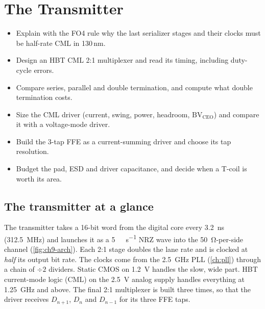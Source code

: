 \chapter{The Transmitter}\label{ch:tx}

\begin{objectives}
\begin{itemize}
  \item Explain with the FO4 rule why the last serializer stages and their clocks must be half-rate CML in 130\,nm.
  \item Design an HBT CML 2:1 multiplexer and read its timing, including duty-cycle errors.
  \item Compare series, parallel and double termination, and compute what double termination costs.
  \item Size the \OS{} CML driver (current, swing, power, headroom, $\mathrm{BV}_\mathrm{CEO}$) and compare it with a voltage-mode driver.
  \item Build the 3-tap FFE as a current-summing driver and choose its tap resolution.
  \item Budget the pad, ESD and driver capacitance, and decide when a T-coil is worth its area.
\end{itemize}
\end{objectives}

\section{The transmitter at a glance}\label{sec:ch9-overview}

The transmitter takes a 16-bit word from the digital core every \qty{3.2}{\nano\second} (\qty{312.5}{\mega\hertz}) and launches it as a \qty{5}{\giga\bit\per\second} NRZ wave into the \qty{50}{\ohm}-per-side channel (\cref{fig:ch9-arch}). Each 2:1 stage doubles the lane rate and is clocked at \emph{half} its output bit rate. The clocks come from the \qty{2.5}{\giga\hertz} PLL (\cref{ch:pll}) through a chain of $\div2$ dividers. Static CMOS on \qty{1.2}{\volt} handles the slow, wide part. HBT current-mode logic (CML) on the \qty{2.5}{\volt} analog supply handles everything at \qty{1.25}{\giga\hertz} and above. The final 2:1 multiplexer is built three times, so that the driver receives $D_{n+1}$, $D_n$ and $D_{n-1}$ for its three FFE taps.

